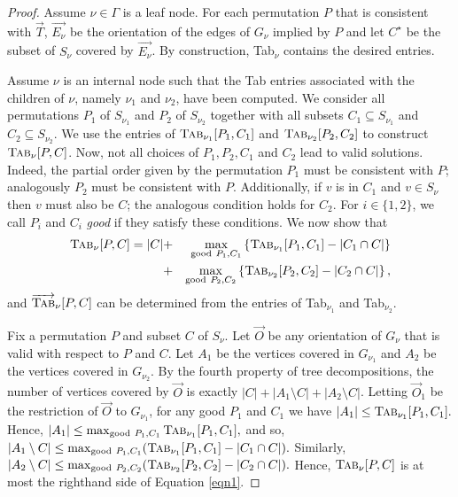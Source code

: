 \documentclass{article}
\newcommand{\ora}{\overrightarrow}
\begin{document}
\begin{proof}
Assume  $\nu \in \Gamma$ is a leaf node.  For each permutation $P$ that is consistent with $\ora{T}$, $\ora{E_\nu}$ be the orientation of the edges of $G_\nu$ implied by $P$ and let $C^\star$ be the subset of $S_\nu$ covered by $\ora{E_\nu}$.  By construction,  {\sc Tab}$_\nu$ contains the desired entries.

Assume $\nu$ is an internal node such that the {\sc Tab} entries associated with the children of $\nu$, namely $\nu_1$ and $\nu_2$, have been computed.  
We consider all permutations $P_1$ of $S_{\nu_1}$ and $P_2$ of $S_{\nu_2}$ together with all subsets $C_1 \subseteq S_{\nu_1}$ and $C_2 \subseteq S_{\nu_2}$.
We use the entries of ${\mbox{\sc Tab}}_{\nu_1}[P_1,C_1]$ and ${\mbox{\sc Tab}}_{\nu_2}[P_2,C_2]$ to construct ${\mbox{\sc Tab}}_{\nu}[P,C]$.
Now, not all choices of $P_1, P_2, C_1$ and $C_2$ lead to valid solutions.
Indeed, the partial order given by the permutation $P_1$ must be consistent with $P$; analogously $P_2$ must be consistent with $P$. 
Additionally, if $v$ is in $C_1$ and $v \in S_\nu$ then $v$ must also be $C$; the analogous condition holds for $C_2$. 
For $i \in \{1,2\}$, we call $P_i$ and  $C_i$ {\em good} if they satisfy these conditions.
We now show that 
\begin{eqnarray}
{\mbox{\sc Tab}}_\nu[P,C] 
= |C| &+& \max_{{\rm good}~P_1, C_1}
\left\{  
{\mbox{\sc Tab}}_{\nu_1}[P_1,C_1] - |C_1 \cap C|
\right\} 
\\\nonumber &+& \max_{
{{\rm good}}~P_2, C_2}
\left\{  
{\mbox{\sc Tab}}_{\nu_2}[P_2,C_2]  - |C_2 \cap C|
\right\},
\label{eqn1}
\end{eqnarray}
and $\ora {\mbox{\sc Tab}}_\nu[P,C]$ can be determined from the entries of {\sc Tab}$_{\nu_1}$ and {\sc Tab}$_{\nu_2}$.


Fix a permutation $P$ and subset $C$ of $S_\nu$.
Let $\ora O$ be any orientation of $G_\nu$ that is valid with respect to $P$ and $C$.
Let $A_1$ be the vertices covered in $G_{\nu_1}$ and $A_2$ be the vertices covered in $G_{\nu_2}$.
By the fourth property of tree decompositions, the number of vertices covered by $\ora O$ is exactly $|C| + |A_1 \setminus C| + |A_2 \setminus C|$.
Letting $\ora O_1$ be the restriction of $\ora O$ to $G_{\nu_1}$, for any good $P_1$ and $C_1$ we have $|A_1| \le {\mbox{\sc Tab}}_{\nu_1}[P_1,C_1].$
Hence, $|A_1| \le \max_{{\rm good}~ P_1, C_1}{\mbox{\sc Tab}}_{\nu_1}[P_1,C_1],$ and so, 
$|A_1 \setminus C| \le \max_{{\rm good}~ P_1, C_1}( {\mbox{\sc Tab}}_{\nu_1}[P_1,C_1] - |C_1 \cap C|).$
Similarly, $|A_2 \setminus C| \le \max_{{\rm good}~ P_2, C_2}( {\mbox{\sc Tab}}_{\nu_2}[P_2,C_2] - |C_2 \cap C|).$
Hence, 
${\mbox{\sc Tab}}_\nu[P,C]$ is at most the righthand side of Equation \ref{eqn1}.


\end{proof}
\end{document}
